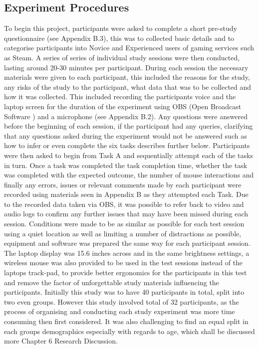 \subsection{Experiment Procedures}
To begin this project, participants were asked to complete a short pre-study questionnaire (see Appendix B.3), this was to collected basic details and to categorise participants into Novice and Experienced users of gaming services such as Steam. A series of series of individual study sessions were then conducted, lasting around 20-30 minutes per participant. During each session the necessary materials were given to each participant, this included the reasons for the study, any risks of the study to the participant, what data that was to be collected and how it was collected. This included recording the participants voice and the laptop screen for the duration of the experiment using OBS (Open Broadcast Software \citep{OBS2019}) and a microphone (see Appendix B.2). Any questions were answered before the beginning of each session, if the participant had any queries, clarifying that any questions asked during the experiment would not be answered such as how to infer or even complete the six tasks describes further below. Participants were then asked to begin from Task A and sequentially attempt each of the tasks in turn. Once a task was completed the task completion time, whether the task was completed with the expected outcome, the number of mouse interactions and finally any errors, issues or relevant comments made by each participant were recorded using materials seen in Appendix B as they attempted each Task. Due to the recorded data taken via OBS, it was possible to refer back to video and audio logs to confirm any further issues that may have been missed during each session. Conditions were made to be as similar as possible for each test session using a quiet location as well as limiting a number of distractions as possible, equipment and software was prepared the same way for each participant session. The laptop display was 15.6 inches across and in the same brightness settings, a wireless mouse was also provided to be used in the test sessions instead of the laptops track-pad, to provide better ergonomics for the participants in this test and remove the factor of unforgettable study materials influencing the participants. Initially this study was to have  40 participants in total, split into two even groups. However this study involved total of 32 participants, as the process of organising and conducting each study experiment was more time consuming then first considered. It was also challenging to find an equal split in each groups demographics especially with regards to age, which shall be discussed more  Chapter 6 Research Discussion. 

